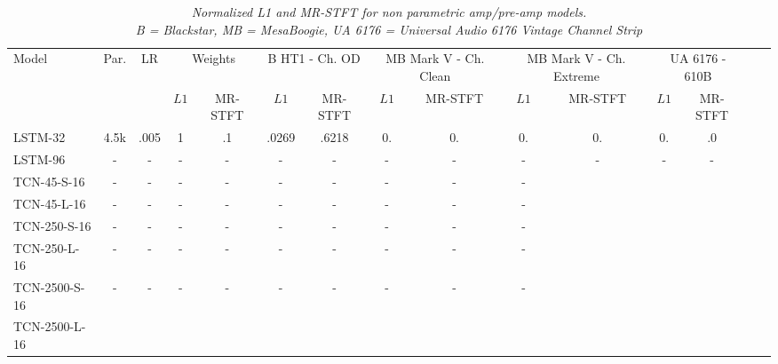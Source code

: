 \setlength{\tabcolsep}{4pt}
\begin{table*}[h]
    \centering
    \small
    \caption{\textit{Normalized L1 and MR-STFT for non parametric amp/pre-amp models.\\B = Blackstar, MB = MesaBoogie, UA 6176 = Universal Audio 6176 Vintage Channel Strip}}
    \hspace*{-0cm}
    \begin{tabular}{lcccccccccccccc} 
        \toprule
        \multirow{2}{*}{Model}
            & \multirow{2}{*}{Par.}
                & \multirow{2}{*}{LR}
                    & \multicolumn{2}{c}{Weights}
                        & \multicolumn{2}{c}{B HT1 - Ch. OD} 
                            & \multicolumn{2}{c}{MB Mark V - Ch. Clean} 
                                &  \multicolumn{2}{c}{MB Mark V - Ch. Extreme} 
                                    & \multicolumn{2}{c}{UA 6176 - 610B} \\ 
        \cmidrule(lr){4-5} 
            \cmidrule(lr){6-7} 
                \cmidrule(lr){8-9} 
                    \cmidrule(lr){10-11}
                        \cmidrule(lr){12-13}    
        &   &   & $L1$ & MR-STFT & $L1$ & MR-STFT & $L1$ & MR-STFT & $L1$ & MR-STFT & $L1$ & MR-STFT \\ 
        \midrule
        LSTM-32
            & 4.5k  & .005 & 1 & .1 & .0269 & .6218 & 0. & 0. & 0. & 0. & 0. & .0\\ 
        LSTM-96       
            & - & - & - & - & - & - & - & - & - & - & - & - \\ 
        \midrule
        TCN-45-S-16               
            & - & - & - & - & - & - & - & - & - \\ 
        TCN-45-L-16               
            & - & - & - & - & - & - & - & - & - \\
        TCN-250-S-16               
            & - & - & - & - & - & - & - & - & - \\ 
        TCN-250-L-16               
            & - & - & - & - & - & - & - & - & - \\
        TCN-2500-S-16               
            & - & - & - & - & - & - & - & - & - \\ 
        TCN-2500-L-16               

\end{tabular}
\end{table*}
